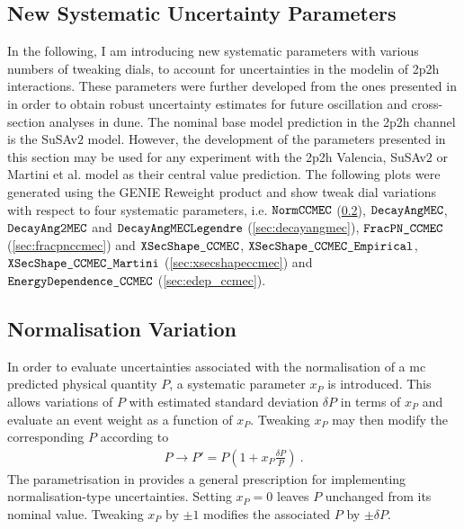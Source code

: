 \subsection{New Systematic Uncertainty Parameters} \label{set3}
In the following, I am introducing new systematic parameters with various numbers of tweaking dials, to account for uncertainties in the modelin of \acrshort{2p2h} interactions. These parameters were further developed from the ones presented in \cite{PhysRevD.105.072001} in order to obtain robust uncertainty estimates for future oscillation and cross-section analyses in \acrshort{dune}. The nominal base model prediction in the \acrshort{2p2h} channel is the SuSAv$2$ model. However, the development of the parameters presented in this section may be used for any experiment with the \acrshort{2p2h} Valencia, SuSAv$2$ or Martini et al. model as their central value prediction. The following plots were generated using the GENIE Reweight product \cite{web:genie_reweight} and show tweak dial variations with respect to four systematic parameters, i.e. $\verb!NormCCMEC!$ (\cref{sec:normccmec}), $\verb!DecayAngMEC!$, $\verb!DecayAng2MEC!$ and $\verb!DecayAngMECLegendre!$  (\cref{sec:decayangmec}), $\verb!FracPN_CCMEC!$ (\cref{sec:fracpnccmec}) and $\verb!XSecShape_CCMEC!$, $\verb!XSecShape_CCMEC_Empirical!$, $\verb!XSecShape_CCMEC_Martini!$ (\cref{sec:xsecshapeccmec}) and $\verb!EnergyDependence_CCMEC!$ (\cref{sec:edep_ccmec}).

\subsection{Normalisation Variation} \label{sec:normccmec}
In order to evaluate uncertainties associated with the normalisation of a \acrfull{mc} predicted physical quantity $P$, a systematic parameter $x_P$ is introduced. This allows variations of $P$ with estimated standard deviation $\delta P$ in terms of $x_P$ and evaluate an event weight as a function of $x_P$. Tweaking $x_P$ may then modify the corresponding $P$ according to \cite{Andreopoulos:2009rq}
%
\begin{align} \label{eq:normalisation_tweak}
    P \longrightarrow P' = P\left( 1 + x_P \frac{\delta P}{P} \right) \ .
\end{align}
%
The parametrisation in  provides a general prescription for implementing normalisation-type uncertainties. Setting $x_P=0$ leaves $P$ unchanged from its nominal value. Tweaking $x_P$ by $\pm 1$ modifies the associated $P$ by $\pm \delta P$.


